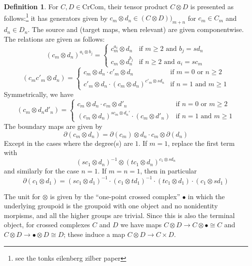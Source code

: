 \documentclass[12pt]{article}
\theoremstyle{definition}
\newtheorem{definition}[theorem]{Definition}
\newcommand{\crcom}{\text{CrCom}}
\newcommand{\del}{\partial}
\begin{document}
\begin{definition}
	For $C,D \in \crcom$, their tensor product $C \otimes D$ is presented as follows:\footnote{see the tonks eilenberg zilber paper} 
	it has generators given by $c_m \otimes d_n \in (C \otimes D))_{m+n}$ for $c_m \in C_m$	and $d_n \in D_n$. The source and (target maps, when relevant) are given componentwise. 
	The relations are given as follows:
	$$
	(c_m \otimes d_n)^{a_i \otimes b_j} = 
	\begin{cases}
		c_m^{a_i} \otimes d_n & \text{if }m \ge 2\text{ and } b_j = sd_n \\
		c_m \otimes d_n^{b_j} & \text{if } n \ge 2 \text{ and } a_i = sc_m
	\end{cases}
	$$
	$$
	(c_mc'_m \otimes d_n) = 
	\begin{cases}
		c_m \otimes d_n \cdot c'_m\otimes d_n & \text{if }m = 0 \text{ or } n \ge 2 \\
		c'_m \otimes d_n \cdot (c_m \otimes d_n)^{c'_m \otimes sd_n} & \text{if } n = 1 \text{ and } m \ge 1
	\end{cases}
	$$
	Symmetrically, we have
	$$
	(c_m \otimes d_nd'_n) = 
	\begin{cases}
		c_m \otimes d_n \cdot c_m\otimes d'_n & \text{if } n = 0 \text{ or } m \ge 2 \\
		(c_m \otimes d_n)^{sc_m \otimes d_n'} \cdot (c_m \otimes d'_n) & \text{if } n = 1 \text{ and } m \ge 1
	\end{cases}
	$$
	The boundary maps are given by 
	$$\del (c_m \otimes d_n) = \del(c_m) \otimes d_n \cdot c_m \otimes \del(d_n)$$
	Except in the cases where the degree(s) are $1$. If $m = 1$, replace the first term with
	$$(sc_1 \otimes d_n)^{-1} \otimes (tc_1 \otimes d_n)^{c_1 \otimes sd_n}$$
	and similarly for the case $n = 1$.
	If $m = n = 1$, then in particular 
	$$\del(c_1 \otimes d_1) = (sc_1 \otimes d_1)^{-1} \cdot (c_1 \otimes td_1)^{-1} \cdot (tc_1 \otimes d_1) \cdot (c_1 \otimes sd_1) $$
\end{definition}
The unit for $\otimes$ is given by the ``one-point crossed complex'' $\bullet$ in which the underlying groupoid is the groupoid with one object and no nonidentity morpisms, and all the higher groups are trivial. 
Since this is also the terminal object, for crossed complexes $C$ and $D$ we have maps $C \otimes D \to C \otimes \bullet \cong C$ and $C \otimes D \to \bullet \otimes D \cong D$; 
these induce a map $C \otimes D \to C \times D$. 
\end{document}
